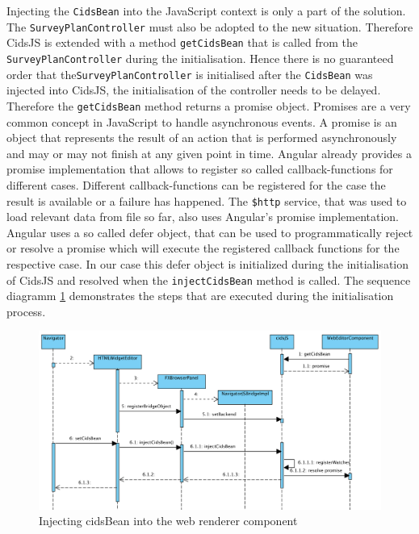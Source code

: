Injecting the \texttt{CidsBean} into the JavaScript context is only a part of the solution.
The \texttt{SurveyPlanController} must also be adopted to the new situation.
Therefore CidsJS is extended with a method \texttt{getCidsBean} that is called from the \texttt{SurveyPlanController} during the initialisation.
Hence there is no guaranteed order that the\texttt{SurveyPlanController} is initialised after the \texttt{CidsBean} was injected into CidsJS, the initialisation of the controller needs to be delayed.
Therefore the \texttt{getCidsBean} method returns a promise object.
Promises are a very common concept in JavaScript to handle asynchronous events.
A promise is an object that represents the result of an action that is performed asynchronously and may or may not finish at any given point in time.
Angular already provides a promise implementation that allows to register so called callback-functions for different cases.
Different callback-functions can be registered for the case the result is available or a failure has happened.
The \texttt{\$http} service, that was used to load relevant data from file so far, also uses Angular’s promise implementation.
Angular uses a so called defer object, that can be used to programmatically reject or resolve a promise which will execute the registered callback functions for the respective case.
In our case this defer object is initialized during the initialisation of CidsJS and resolved when the \texttt{injectCidsBean} method is called. The sequence diagramm \ref{fig:seq-diag-data-exchange-1} demonstrates the steps that are executed during the initialisation process.

\begin{figure}
	\centering	\includegraphics[width=1.0\textwidth]{./img/classDiagramms/seq_diag_data_exchange.png}
	\caption{Injecting cidsBean into the web renderer component}
	\label{fig:seq-diag-data-exchange-1}
\end{figure}

